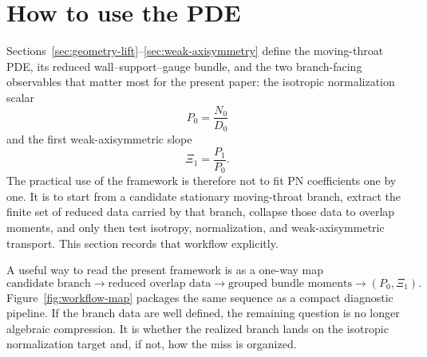 \documentclass[11pt]{article}
\theoremstyle{definition}
\newcommand{\XiOne}{\ensuremath{\Xi_1}}
\begin{document}
\section{How to use the PDE}
\label{sec:how-to-use}

Sections~\ref{sec:geometry-lift}--\ref{sec:weak-axisymmetry} define the moving-throat PDE, its reduced wall--support--gauge bundle, and the two branch-facing observables that matter most for the present paper: the isotropic normalization scalar
\[
P_0=\frac{N_0}{D_0}
\]
and the first weak-axisymmetric slope
\[
\XiOne=\frac{P_1}{P_0}.
\]
The practical use of the framework is therefore not to fit PN coefficients one by one. It is to start from a candidate stationary moving-throat branch, extract the finite set of reduced data carried by that branch, collapse those data to overlap moments, and only then test isotropy, normalization, and weak-axisymmetric transport. This section records that workflow explicitly.

A useful way to read the present framework is as a one-way map
\[
\text{candidate branch}
\longrightarrow
\text{reduced overlap data}
\longrightarrow
\text{grouped bundle moments}
\longrightarrow
(P_0,\XiOne).
\]
Figure~\ref{fig:workflow-map} packages the same sequence as a compact diagnostic pipeline.
If the branch data are well defined, the remaining question is no longer algebraic compression. It is whether the realized branch lands on the isotropic normalization target and, if not, how the miss is organized.
\end{document}

